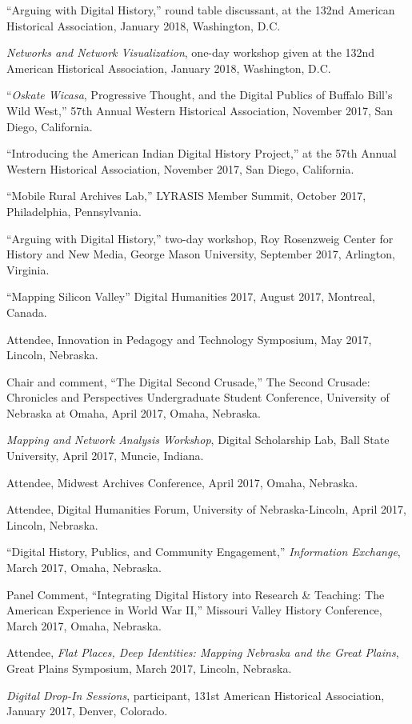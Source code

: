 ``Arguing with Digital History,'' round table discussant, at the 132nd
American Historical Association, January 2018, Washington, D.C.

\emph{Networks and Network Visualization}, one-day workshop given at the
132nd American Historical Association, January 2018, Washington, D.C.

``\emph{Oskate Wicasa}, Progressive Thought, and the Digital Publics of
Buffalo Bill's Wild West,'' 57th Annual Western Historical Association,
November 2017, San Diego, California.

``Introducing the American Indian Digital History Project,'' at the 57th
Annual Western Historical Association, November 2017, San Diego,
California.

``Mobile Rural Archives Lab,'' LYRASIS Member Summit, October 2017,
Philadelphia, Pennsylvania.

``Arguing with Digital History,'' two-day workshop, Roy Rosenzweig
Center for History and New Media, George Mason University, September
2017, Arlington, Virginia.

``Mapping Silicon Valley'' Digital Humanities 2017, August 2017,
Montreal, Canada.

Attendee, Innovation in Pedagogy and Technology Symposium, May 2017,
Lincoln, Nebraska.

Chair and comment, ``The Digital Second Crusade,'' The Second Crusade:
Chronicles and Perspectives Undergraduate Student Conference, University
of Nebraska at Omaha, April 2017, Omaha, Nebraska.

\emph{Mapping and Network Analysis Workshop}, Digital Scholarship Lab,
Ball State University, April 2017, Muncie, Indiana.

Attendee, Midwest Archives Conference, April 2017, Omaha, Nebraska.

Attendee, Digital Humanities Forum, University of Nebraska-Lincoln,
April 2017, Lincoln, Nebraska.

``Digital History, Publics, and Community Engagement,''
\emph{Information Exchange}, March 2017, Omaha, Nebraska.

Panel Comment, ``Integrating Digital History into Research \& Teaching:
The American Experience in World War II,'' Missouri Valley History
Conference, March 2017, Omaha, Nebraska.

Attendee, \emph{Flat Places, Deep Identities: Mapping Nebraska and the
Great Plains}, Great Plains Symposium, March 2017, Lincoln, Nebraska.

\emph{Digital Drop-In Sessions}, participant, 131st American Historical
Association, January 2017, Denver, Colorado.

